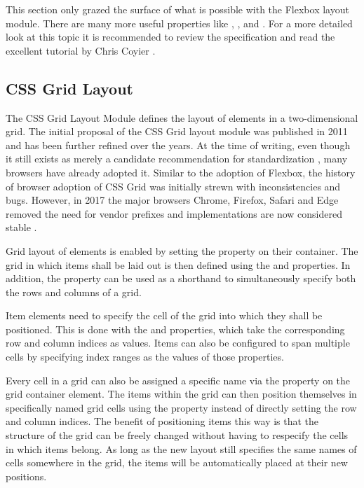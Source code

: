 This section only grazed the surface of what is possible with the
Flexbox layout module. There are many more useful properties like
, , and .
For a more detailed look at this topic it is recommended to review the
specification \parencite{CSSFlexbox} and read the excellent tutorial
by Chris Coyier \parencite{Coyier-FlexboxGuide}.





\subsection{CSS Grid Layout}
\label{sec:Grid}

The CSS Grid Layout Module \parencite{CSSGrid} defines the layout of
elements in a two-dimensional grid. The initial proposal of the CSS
Grid layout module was published in 2011 \parencite{CSSGridFirstDraft}
and has been further refined over the years. At the time of writing,
even though it still exists as merely a candidate recommendation for
standardization \parencite{CSSGrid}, many browsers have already
adopted it. Similar to the adoption of Flexbox, the history of browser
adoption of CSS Grid was initially strewn with inconsistencies and
bugs. However, in 2017 the major browsers Chrome, Firefox, Safari and
Edge removed the need for vendor prefixes and implementations are now
considered stable \parencite{CanIUseCSSGrid}.

Grid layout of elements is enabled by setting the
 property on their container. The grid in which
items shall be laid out is then defined using the
 and 
properties. In addition, the  property can be
used as a shorthand to simultaneously specify both the rows and
columns of a grid.

Item elements need to specify the cell of the grid into which they
shall be positioned. This is done with the  and
 properties, which take the corresponding row and
column indices as values. Items can also be configured to span
multiple cells by specifying index ranges as the values of those
properties.

Every cell in a grid can also be assigned a specific name via the
 property on the grid container element.
The items within the grid can then position themselves in specifically
named grid cells using the  property instead of
directly setting the row and column indices. The benefit of
positioning items this way is that the structure of the grid can
be freely changed without having to respecify the cells in which items
belong. As long as the new layout still specifies the same names of
cells somewhere in the grid, the items will be automatically placed at
their new positions.

